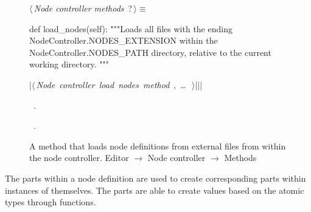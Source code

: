 \documentclass[%
    a4paper,    %
    justified,  %
    nobib,      %
    openany     %
]{tufte-book}
\makeatletter
\renewcommand{\label}[1]{\@tufte@label{##1}}%
\makeatother
\begin{document}
\begin{figure}
\begin{flushleft} \small
\begin{minipage}{\linewidth}\label{scrap108}\raggedright\small
{} $\langle\,${\itshape Node controller methods}\nobreak\ {\footnotesize {?}}$\,\rangle\equiv$
\vspace{-1ex}
\begin{pythoncode}
def load_nodes(self):
    """Loads all files with the ending NodeController.NODES_EXTENSION
    within the NodeController.NODES_PATH directory, relative to the current
    working directory.
    """

    |\hbox{$\langle\,${\itshape Node controller load nodes method}\nobreak\ {\footnotesize {}, \ldots\ }$\,\rangle$}||\NWsep|
\end{pythoncode}
\vspace{1.5ex}
\footnotesize
\begin{list}{}{\setlength{\itemsep}{-\parsep}\setlength{\itemindent}{-\leftmargin}}
\item \NWtxtMacroDefBy\ .
\item \NWtxtMacroRefIn\ .

\item{}
\end{list}
\end{minipage}\vspace{4ex}
\end{flushleft}
\caption{A method that loads node definitions from external files from within
  the node controller.
  \newline{}\newline{}Editor $\rightarrow$ Node controller $\rightarrow$
  Methods}
\label{editor:lst:node-controller:methods:load-nodes}
\end{figure}

 The parts within a node
definition are used to create corresponding parts within instances of
themselves. The parts are able to create values based on the atomic types
through functions.
\end{document}
